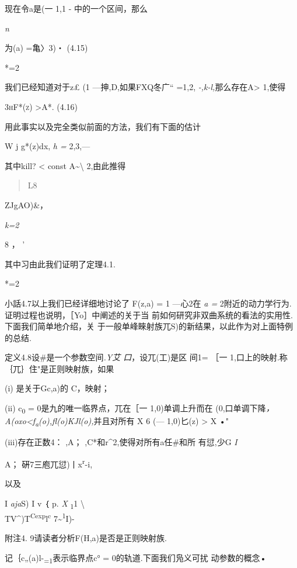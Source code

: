 \documentclass{article}
\begin{document}
现在令a是(一 1,1 - 中的一个区间，那么

\emph{n}

为(a) =亀〉3)・ (4.15)

*=2

我们已经知道对于z£ (1 ---抻,D,如果FXQ冬广`` =1,2,
\emph{-,k-l,}那么存在A\textgreater{} 1,使得

\textsc{\textbar{}3hF*(z)\textbar{}} \textgreater{}A*. (4.16)

用此事实以及完全类似前面的方法，我们有下面的估计

W j g*(z)dx, \emph{h =} 2,3,---

其中kill? \textless{} const A\textasciitilde{}\textbackslash{}
2,由此推得

\begin{quote}
L8
\end{quote}

ZJgAO)\&，

\emph{k=2}

8 ， '

其中习由此我们证明了定理4.1. \textbar{}

*=2

小話4.7以上我们已经详细地讨论了 F(z,a) = 1 ---心2在 \emph{a =}
2附近的动力学行为.证明过程也说明，［Yo］中阐述的关于当
前如何研究非双曲系统的看法的实用性.下面我们简单地介绍，关
于一般单峰睞射族兀S)的新结果，以此作为对上面特例的总结.

定义4.8设\#是一个参数空间\emph{.Y艾 口}，设兀(工)是区 间1= ［一
1,口上的映射.称｛兀｝住"是正则映射族，如果

(i) 是关于Gc,a)的 C，映射；

(ii) c\textsubscript{0} = 0是九的唯一临界点，兀在［一 1,0)单调上升而在
(0,口单调下降\emph{，A(oxo\textless{}f\textsubscript{a}(o),fl(o)KJl(o),}并且对所有
X 6 (--- 1,0)匕(z) \textgreater{} X\textbar{} •"

(iii)存在正数4： ,A； ,C*和r\^{}2,使得对所有a任\#和所 有愆,少G \emph{I}

A； \textbar{}硏7三庖兀愆)丨\textbar{}x\textbar{}\textsuperscript{r}-i,

以及

I \emph{aja}S) I v ｛ p. \emph{X} \textsubscript{1}1 \textbackslash{}\\
TV\^{})T\textsuperscript{Cexp}l\textsuperscript{c}
7\textasciitilde{}\textsuperscript{1}I)-

附注4. 9请读者分析F(H,a)是否是正则映射族.

记｛c„(a)l-\textsubscript{=1}表示临界点c° = 0的轨道.下面我们凫义可扰
动参数的概念•
\end{document}

